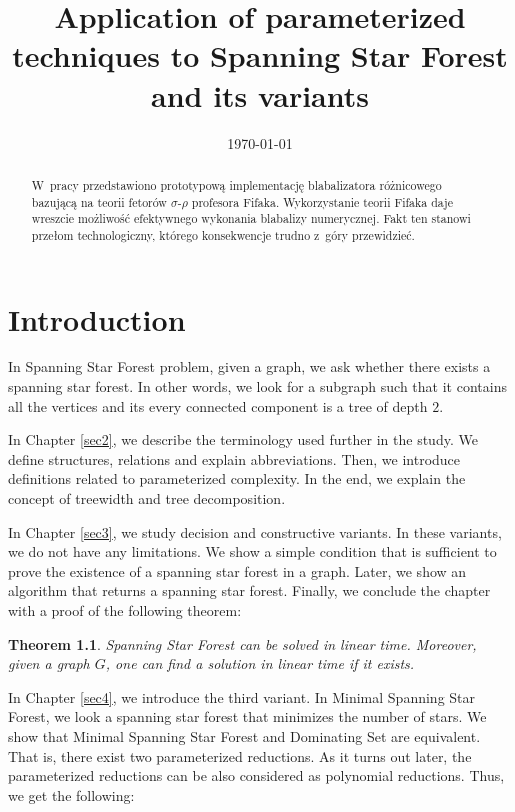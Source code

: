 \documentclass[en]{pracamgr}
\title{Application of parameterized techniques to Spanning Star Forest and its variants}
\date{\monthyeardate\today}
\newtheorem{theorem}{Theorem}
\theoremstyle{definition}
\newcommand{\ssfp}{{\sc Spanning Star Forest}}
\newcommand{\mssfp}{{\sc Minimal Spanning Star Forest}}
\newcommand{\domsetp}{{\sc Dominating Set}}
\begin{document}
\maketitle

\begin{abstract}
  W~pracy przedstawiono prototypową implementację blabalizatora
  różnicowego bazującą na teorii fetorów $\sigma$-$\rho$ profesora
  Fifaka.  Wykorzystanie teorii Fifaka daje wreszcie możliwość
  efektywnego wykonania blabalizy numerycznej.  Fakt ten stanowi
  przełom technologiczny, którego konsekwencje trudno z~góry
  przewidzieć.
\end{abstract}

\tableofcontents

\chapter{Introduction}

In \ssfp{} problem, given a graph, we ask whether there exists a spanning star forest. In other words, we look for a subgraph such that it contains all the vertices and its every connected component is a tree of depth $2$. 

In Chapter \ref{sec2}, we describe the terminology used further in the study. We define structures, relations and explain abbreviations. Then, we introduce definitions related to parameterized complexity. In the end, we explain the concept of treewidth and tree decomposition. 

In Chapter \ref{sec3}, we study decision and constructive variants. In these variants, we do not have any limitations. We show a simple condition that is sufficient to prove the existence of a spanning star forest in a graph. Later, we show an algorithm that returns a spanning star forest. Finally, we conclude the chapter with a proof of the following theorem:

\begin{theorem}\label{thm-ssfp}
	\ssfp{} can be solved in linear time. Moreover, given a graph $G$, one can find a solution in linear time if it exists.
\end{theorem}

In Chapter \ref{sec4}, we introduce the third variant. In \mssfp{}, we look a spanning star forest that minimizes the number of stars. We show that \mssfp{} and \domsetp{} are equivalent. That is, there exist two parameterized reductions. As it turns out later, the parameterized reductions can be also considered as polynomial reductions. Thus, we get the following:
\end{document}
